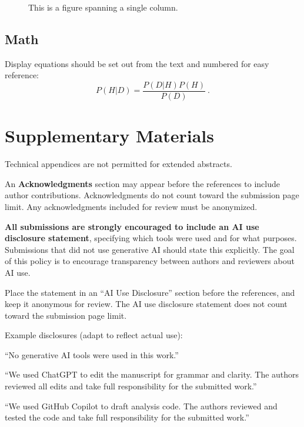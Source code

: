\documentclass{ccn}  %
\begin{document}
\begin{figure}[ht]
  \begin{center}
    \fbox{\rule[-.5cm]{0cm}{4cm} \rule[-.5cm]{4cm}{0cm}}
  \end{center}
  \caption{This is a figure spanning a single column.}
  \label{sample-figure}
\end{figure}

\subsection{Math}

Display equations should be set out from the text and numbered for easy reference:
\begin{equation}
  P(H|D) = \frac{P(D|H)P(H)}{P(D)}~.
\end{equation}

\section{Supplementary Materials}

Technical appendices are not permitted for extended abstracts.

An {\bf Acknowledgments} section may appear before the references to include author
contributions.
Acknowledgments do not count toward the submission page limit.
Any acknowledgments included for review must be anonymized.

\textbf{All submissions are strongly encouraged to include an AI use disclosure statement},
specifying which tools were used and for what purposes.
Submissions that did not use generative AI should state this explicitly.
The goal of this policy is to encourage transparency between authors and reviewers about AI use.

Place the statement in an ``AI Use Disclosure'' section before the references,
and keep it anonymous for review.
The AI use disclosure statement does not count toward the submission page limit.

Example disclosures (adapt to reflect actual use):

``No generative AI tools were used in this work.''

``We used ChatGPT to edit the manuscript for grammar and clarity.
The authors reviewed all edits and take full responsibility for
the submitted work.''

``We used GitHub Copilot to draft analysis code.
The authors reviewed and tested the code and take full responsibility for
the submitted work.''
\end{document}
